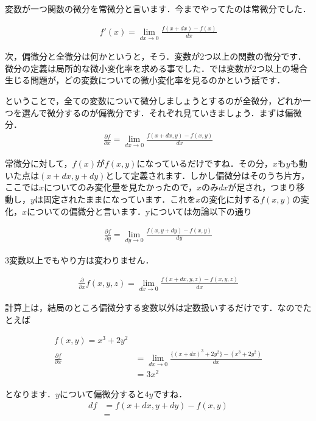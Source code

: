 \documentclass[11pt,a4paper,uplatex]{ujreport}
\begin{document}
変数が一つ関数の微分を常微分と言います．今までやってたのは常微分でした．

\begin{eqnarray}
f'(x) =\lim_{dx \rightarrow 0} \frac{f(x+dx) - f(x)}{dx}
\end{eqnarray}

次，偏微分と全微分は何かというと，そう．変数が2つ以上の関数の微分です．微分の定義は局所的な微小変化率を求める事でした．では変数が2つ以上の場合生じる問題が，どの変数についての微小変化率を見るのかという話です．

ということで，全ての変数について微分しましょうとするのが全微分，どれか一つを選んで微分するのが偏微分です．それぞれ見ていきましょう．まずは偏微分．\\

\begin{eqnarray}
\label{eq:partial}
\frac{\partial f}{\partial x} = \lim_{dx \rightarrow 0} \frac{f(x+dx, y) - f(x, y)}{dx}
\end{eqnarray}

常微分に対して，$f(x)$が$f(x,y)$になっているだけですね．その分，$x$も$y$も動いた点は$(x+dx, y+dy)$として定義されます．しかし偏微分はそのうち片方，ここでは$x$についてのみ変化量を見たかったので，$x$のみ$dx$が足され，つまり移動し，$y$は固定されたままになっています．これを$x$の変化に対する$f(x,y)$の変化，$x$についての偏微分と言います．yについては勿論以下の通り

\begin{eqnarray}
\frac{\partial f}{\partial y} = \lim_{dy \rightarrow 0} \frac{f(x, y+dy) - f(x, y)}{dy}
\end{eqnarray}

3変数以上でもやり方は変わりません．

\begin{eqnarray}
\frac{\partial}{\partial x}f(x,y,z) = \lim_{dx \rightarrow 0} \frac{f(x+dx, y,z) - f(x, y,z)}{dx}
\end{eqnarray}

計算上は，結局のところ偏微分する変数以外は定数扱いするだけです．なのでたとえば

\begin{align}
f(x,y) = x^3 + 2y^2\\
\frac{\partial f}{\partial x} &= \lim_{dx \rightarrow 0} \frac{\{(x+dx)^3 + 2y^2\} - (x^3 + 2y^2)}{dx}\\
&= 3x^2
\end{align}

となります．$y$について偏微分すると$4y$ですね．
\begin{align}
df &= f(x+dx, y+dy) - f(x,y)\\
&= 
\end{align}
\end{document}
